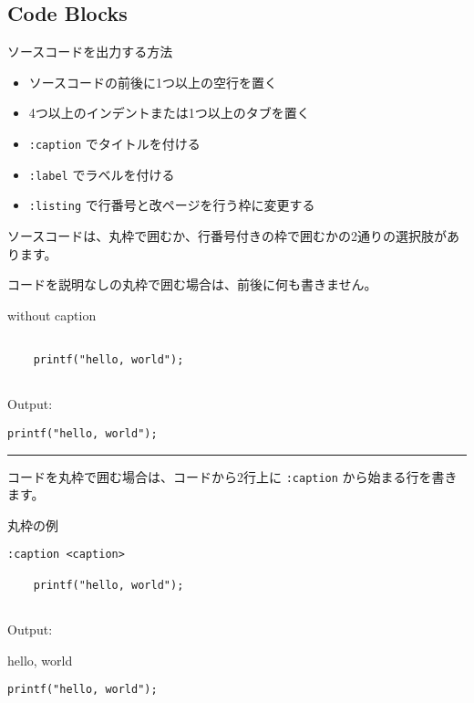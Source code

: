 \documentclass[a4j, titlepage]{jarticle}
\begin{document}
\subsection{Code Blocks}

ソースコードを出力する方法

\begin{itemize}
\item ソースコードの前後に1つ以上の空行を置く
\item 4つ以上のインデントまたは1つ以上のタブを置く
\item {\tt :caption} でタイトルを付ける
\item {\tt :label} でラベルを付ける
\item {\tt :listing} で行番号と改ページを行う枠に変更する
\end{itemize}

ソースコードは、丸枠で囲むか、行番号付きの枠で囲むかの2通りの選択肢があります。

コードを説明なしの丸枠で囲む場合は、前後に何も書きません。

\begin{itembox}[c]{without caption}
\begin{verbatim}
　
    printf("hello, world");
　
\end{verbatim}
\end{itembox}

Output:

\begin{screen}
\begin{verbatim}
printf("hello, world");
\end{verbatim}
\end{screen}

\begin{center}
\rule{3in}{0.4pt}
\end{center}

コードを丸枠で囲む場合は、コードから2行上に {\tt :caption} から始まる行を書きます。

\begin{itembox}[c]{丸枠の例}
\begin{verbatim}
:caption <caption>

    printf("hello, world");
　
\end{verbatim}
\end{itembox}

Output:

\begin{itembox}[c]{hello, world}
\begin{verbatim}
printf("hello, world");
\end{verbatim}
\end{itembox}
\end{document}
